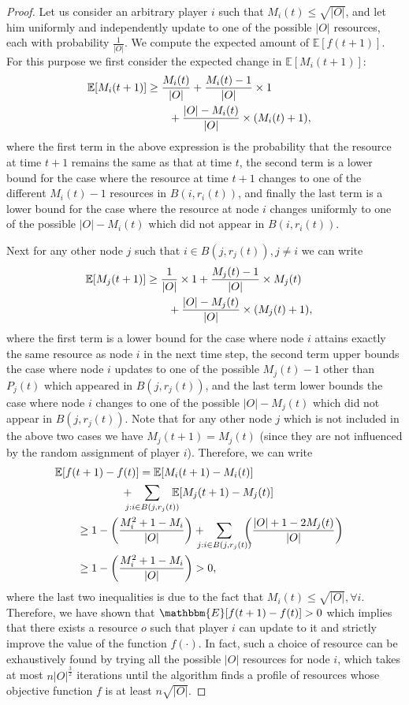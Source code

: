 \begin{proof}
Let us consider an arbitrary player $i$ such that $M_i(t)\leq \sqrt{|O|}$, and let him uniformly and independently update to one of the possible $|O|$ resources, each with probability $\frac{1}{|O|}$. We compute the expected amount of $\mathbb{E}[f(t+1)]$. For this purpose we first consider the expected change in $\mathbb{E}[M_i(t+1)]$:
\begin{align}\nonumber
\mathbb{E}[M_i(t+1)]&\ge \frac{M_i(t)}{|O|}+\frac{M_i(t)-1}{|O|}\times 1\cr
&\qquad+\frac{|O|-M_i(t)}{|O|}\times (M_i(t)+1),
\end{align}
where the first term in the above expression is the probability that the resource at time $t+1$ remains the same as that at time $t$, the second term is a lower bound for the case where the resource at time $t+1$ changes to one of the different $M_i(t)-1$ resources in $B(i,r_i(t))$, and finally the last term is a lower bound for the case where the resource at node $i$ changes uniformly to one of the possible $|O|-M_i(t)$ which did not appear in $B(i,r_i(t))$.

Next for any other node $j$ such that $i\in B(j, r_j(t)), j\neq i$ we can write
\begin{align}\nonumber
\mathbb{E}[M_j(t+1)]&\ge \frac{1}{|O|}\times 1+\frac{M_j(t)-1}{|O|}\times M_j(t)\cr
&\qquad+\frac{|O|-M_j(t)}{|O|}\times (M_j(t)+1),
\end{align}
where the first term is a lower bound for the case where node $i$ attains exactly the same resource as node $i$ in the next time step, the second term upper bounds the case where node $i$ updates to one of the possible $M_j(t)-1$ other than $P_j(t)$ which appeared in $B(j, r_j(t))$, and the last term lower bounds the case where node $i$ changes to one of the possible $|O|-M_j(t)$ which did not appear in $B(j, r_j(t))$. Note that for any other node $j$ which is not included in the above two cases we have $M_j(t+1)=M_j(t)$ (since they are not influenced by the random assignment of player $i$). Therefore, we can write
\begin{align}\nonumber
&\mathbb{E}[f(t+1)-f(t)]=\mathbb{E}[M_i(t+1)-M_i(t)]\cr
&\qquad\qquad\qquad+\!\!\!\!\!\sum_{j: i\in B(j, r_j(t))}\!\!\!\!\!\mathbb{E}[M_j(t+1)-M_j(t)]\cr
&\qquad\ge 1-\left(\frac{M_i^2+1-M_i}{|O|}\right)+\!\!\!\!\!\sum_{j: i\in B(j, r_j(t))}\!\!\!\!\!\left(\frac{|O|+1-2M_j(t)}{|O|}\right)\cr
&\qquad\ge 1-\left(\frac{M_i^2+1-M_i}{|O|}\right) >0,
\end{align}
where the last two inequalities is due to the fact that $M_i(t)\leq \sqrt{|O|}, \forall i$. Therefore, we have shown that $\mathbbm{E}[f(t+1)-f(t)]>0$ which implies that there exists a resource $o$ such that player $i$ can update to it and strictly improve the value of the function $f(\cdot)$. In fact, such a choice of resource can be exhaustively found by trying all the possible $|O|$ resources for node $i$, which takes at most $n|O|^{\frac{3}{2}}$ iterations until the algorithm finds a profile of resources whose objective function $f$ is at least $n\sqrt{|O|}$.
\end{proof}

